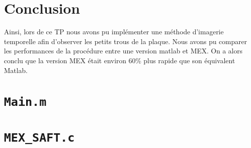 \documentclass[12pt,a4paper,titlepage]{article}
\begin{document}
\section*{Conclusion}

Ainsi, lors de ce TP nous avons pu implémenter une méthode d'imagerie temporelle afin d'observer les
petits trous de la plaque. Nous avons pu comparer les performances de la procédure entre une version
matlab et MEX. On a alors conclu que la version MEX était environ 60\% plus rapide que son équivalent
Matlab.

\pagebreak

\begin{appendices}
    \section{\texttt{Main.m}}

    

    \section{\texttt{MEX\_SAFT.c}}

    
\end{appendices}
\end{document}
